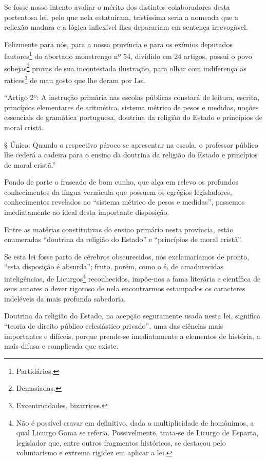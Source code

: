 Se fosse nosso intento avaliar o mérito dos distintos colaboradores
desta portentosa lei, pelo que nela estatuíram, tristíssima seria a
nomeada que a reflexão madura e a lógica inflexível lhes deparariam em
sentença irrevogável.

Felizmente para nós, para a nossa província e para os exímios deputados
fautores\footnote{Partidários.} do abortado monstrengo nº 54, dividido
em 24 artigos, possui o povo sobejas\footnote{Demasiadas.} provas de
sua incontestada ilustração, para olhar com indiferença as
ratices\footnote{Excentricidades, bizarrices.} de mau gosto que lhe
deram por Lei.

``Artigo 2º: A instrução primária nas escolas públicas constará de
leitura, escrita, princípios elementares de aritmética, sistema métrico
de pesos e medidas, noções essenciais de gramática portuguesa, doutrina
da religião do Estado e princípios de moral cristã.

§ Único: Quando o respectivo pároco se apresentar na escola, o professor
público lhe cederá a cadeira para o ensino da doutrina da religião do
Estado e princípios de moral cristã.''

Pondo de parte o fraseado de bom cunho, que alça em relevo os profundos
conhecimentos da língua vernácula que possuem os egrégios legisladores,
conhecimentos revelados no ``sistema métrico de pesos e medidas'',
passemos imediatamente ao ideal desta importante disposição.

Entre as matérias constitutivas do ensino primário nesta província,
estão enumeradas ``doutrina da religião do Estado'' e ``princípios de moral
cristã''.

Se esta lei fosse parto de cérebros obscurecidos, nós exclamaríamos de
pronto, ``esta disposição é absurda''; fruto, porém, como o é, de
amadurecidas inteligências, de Licurgos\footnote{Não é possível cravar
  em definitivo, dada a multiplicidade de homônimos, a qual Licurgo Gama
  se referia. Possivelmente, trata-se de Licurgo de Esparta, legislador
  que, entre outros fragmentos históricos, se destacou pelo voluntarismo
  e extrema rigidez em aplicar a lei.} reconhecidos, impõe-nos a fama
literária e científica de seus autores o dever rigoroso de nela
encontrarmos estampados os caracteres indeléveis da mais profunda
sabedoria.

Doutrina da religião do Estado, na acepção seguramente usada nesta lei,
significa ``teoria de direito público eclesiástico privado'', uma das
ciências mais importantes e difíceis, porque prende-se imediatamente a
elementos de história, a mais difusa e complicada que existe.

